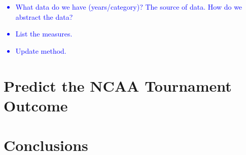 \documentclass[11pt]{article}
\begin{document}
	\textcolor{blue}{
		\begin{itemize}
			\item What data do we have (years/category)? The source of data. How do we abstract the data?
			\item List the measures.
			\item Update method.
		\end{itemize}
	}
\section{Predict the NCAA Tournament Outcome} \label{sec:predict}
\section{Conclusions}



\end{document}

